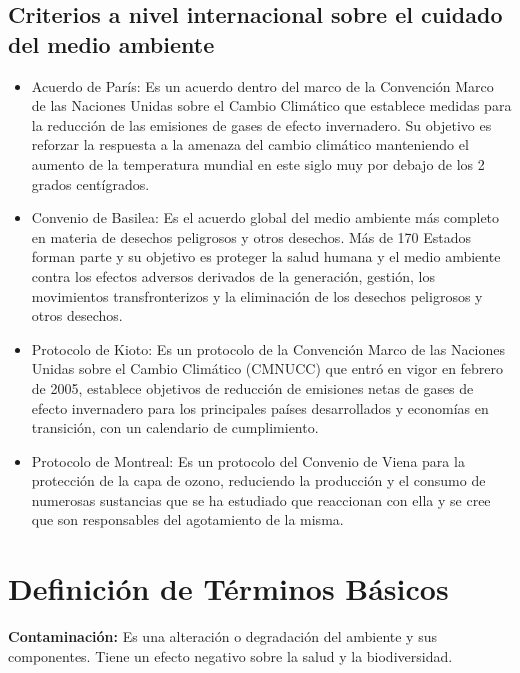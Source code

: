 {\setlength{\parskip}{0cm}
\subsection {Criterios a nivel internacional sobre el cuidado del medio ambiente}

\begin{itemize}
    \item Acuerdo de París: Es un acuerdo dentro del marco de la Convención Marco de las Naciones Unidas sobre el Cambio Climático que establece medidas para la reducción de las emisiones de gases de efecto invernadero. Su objetivo es reforzar la respuesta  a la amenaza del cambio climático manteniendo el aumento de la temperatura mundial en este siglo muy por debajo de los 2 grados centígrados.

    \item Convenio de Basilea: Es el acuerdo global del medio ambiente más completo en materia de desechos peligrosos y otros desechos. Más de 170 Estados forman parte y su objetivo es proteger la salud humana y el medio ambiente contra los efectos adversos derivados de la generación, gestión, los movimientos transfronterizos y la eliminación de los desechos peligrosos y otros desechos. 
    
    \item Protocolo de Kioto: Es un protocolo de la Convención Marco de las Naciones Unidas sobre el Cambio Climático (CMNUCC) que entró en vigor en febrero de 2005, establece objetivos de reducción de emisiones netas de gases de efecto invernadero para los principales países desarrollados y economías en transición, con un calendario de cumplimiento.
    
    \item Protocolo de Montreal: Es un protocolo del Convenio de Viena para la protección de la capa de ozono, reduciendo la producción y el consumo de numerosas sustancias que se ha estudiado que reaccionan con ella y se cree que son responsables del agotamiento de la misma.
\end{itemize}
}

\newpage

{\setlength{\parskip}{0cm}
\section{Definición de Términos Básicos}

\textbf{Contaminación:} Es una alteración o degradación del ambiente y sus componentes. Tiene un efecto negativo sobre la salud y la biodiversidad.
}

